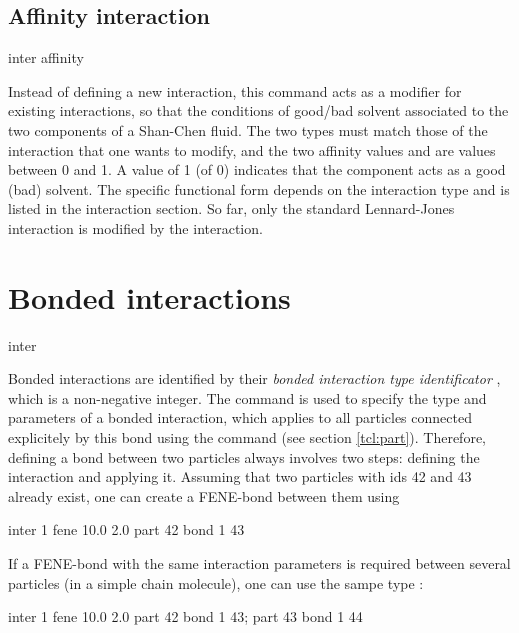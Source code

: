 \subsection{Affinity interaction}
\label{sec:affinity}

\begin{essyntax}
  inter  
  affinity
    
  \begin{features}
  \end{features}
\end{essyntax}

Instead of defining a new interaction, this command acts as a
modifier for existing interactions, so that the conditions of
good/bad solvent associated to the two components of a Shan-Chen
fluid. The two types must match those of the interaction that one
wants to modify, and the two affinity values  and
 are values between 0 and 1. A value of 1 (of 0)
indicates that the component acts as a good (bad) solvent. The
specific functional form depends on the interaction type and is
listed in the interaction section.  So far, only the standard
Lennard-Jones interaction is modified by the 
interaction.



\section{Bonded interactions}
\label{sec:inter-bonded}

\begin{essyntax*}
  inter 
\end{essyntax*}

 Bonded interactions are identified
by their \emph{bonded interaction type identificator} ,
which is a non-negative integer.  The   command
is used to specify the type and parameters of a bonded interaction,
which applies to all particles connected explicitely by this bond
using the  command (see section \vref{tcl:part}).
Therefore, defining a bond between two particles always involves two
steps: defining the interaction and applying it. Assuming that two
particles with ids 42 and 43 already exist, one can create \eg a
FENE-bond between them using
\begin{tclcode}
  inter 1 fene 10.0 2.0
  part 42 bond 1 43
\end{tclcode}
If a FENE-bond with the same interaction parameters is required between several
particles (\eg in a simple chain molecule), one can use the sampe type :
\begin{tclcode}
  inter 1 fene 10.0 2.0
  part 42 bond 1 43; part 43 bond 1 44 
\end{tclcode}

